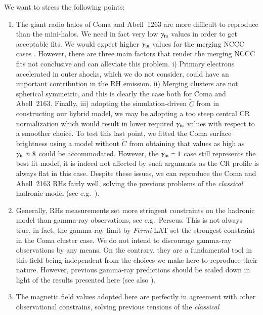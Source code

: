 \documentclass[traditabstract]{aa}
\begin{document}
We want to stress the following points:
\begin{enumerate} 
 \item The giant radio halos of Coma and Abell~1263 are more difficult to reproduce than the mini-halos. 
       We need in fact very low $\gamma_{\rm{tu}}$ values in order to get acceptable fits.
       We would expect higher $\gamma_{\rm{tu}}$ values for the merging NCCC cases \citep{2011A&A...527A..99E}.
       However, there are three main factors that render the merging NCCC fits not conclusive and can alleviate this problem. 
       i) Primary electrons accelerated in outer shocks, which we do not consider, could have an important contribution in the RH emission.
       ii) Merging clusters are not spherical symmetric, and this is clearly the case both for Coma and Abell~2163.
       Finally, iii) adopting the simulation-driven $\tilde{C}$ from \cite{2010MNRAS.409..449P} in constructing our hybrid model, 
       we may be adopting a too steep central CR normalization which would result in lower required $\gamma_{\rm{tu}}$ values with respect to a 
       smoother choice. To test this last point, we fitted the Coma surface brightness using a model without $\tilde{C}$ from \cite{2010MNRAS.409..449P} obtaining  
       that values as high as $\gamma_{\rm{tu}} \approx 8$ could be accommodated. However, the $\gamma_{\rm{tu}}=1$ case still represents the best fit model, it is
       indeed not affected by such arguments as the CR profile is always flat in this case. Despite these issues, we can reproduce the Coma and Abell~2163 RHs 
       fairly well, solving the previous problems of the \emph{classical} hadronic model (see e.g.~\citealp{2010MNRAS.401...47D}). 
 \item Generally, RHs measurements set more stringent constraints on the hadronic model than gamma-ray observations, see e.g.~Perseus. 
       This is not always true, in fact, the gamma-ray limit by \emph{Fermi}-LAT set the strongest constraint in the Coma cluster case.
       We do not intend to discourage gamma-ray observations by any means. On the contrary, they are a fundamental tool in this field being 
       independent from the choices we make here to reproduce their nature. However, previous gamma-ray predictions should be scaled down
       in light of the results presented here (see also \citealp{2011A&A...527A..99E}).
 \item The magnetic field values adopted here are perfectly in agreement with other observational constrains, solving previous tensions of the \emph{classical}

\end{enumerate}
\end{document}
